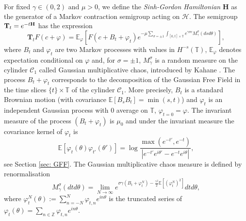 \documentclass[11pt]{amsart}
\numberwithin{equation}{section}
\theoremstyle{definition}
\newcommand{\Z}{\mathbb{Z}}
\def\E{\mathbb{E}}
\newcommand{\mc}{\mathcal}
\def\T{\mathbb{T}}
\begin{document}
For fixed $\gamma\in (0,2)$ and $\mu>0$, we define the \emph{Sinh-Gordon Hamiltonian}  $\mathbf{H}$ as the generator of a Markov contraction 
semigroup acting on $\mc{H}$. The semigroup ${\bf T}_t=e^{-t{\mathbf H}}$ has the expression  
\begin{equation}
{\mathbf  T}_t F(c+\varphi)
=
\mathbb E_{\varphi}[F(c+B_t+\varphi_t)  e^{-\mu \sum_{\sigma = \pm 1}\int_{[0,t]\times \mathbb T} e^{\gamma \sigma c} M^\sigma_\gamma(dsd\theta)}],
\end{equation}
where $B_t$ and $\varphi_t$ are two Markov processes with values in $H^{-s}(\T)$, $\mathbb E_\varphi$ denotes expectation conditional on $\varphi$ and, for $\sigma=\pm 1$,  $M_\gamma^\sigma$ is a random measure on the cylinder $\mc{C}_1$ called Gaussian multiplicative chaos, introduced by Kahane \cite{Kahane85}.
The process $B_t+\varphi_t$ corresponds to the decomposition of the Gaussian Free Field in the 
time slices $\{t\}\times \T$ of the cylinder $\mc{C}_1$. More precisely, $B_t$
is a standard Brownian motion (with covariance $\mathbb E[B_sB_t]=\min(s,t)$) and $\varphi_t$ is an independent Gaussian process with $0$ average on $\T$, $\varphi_{t=0}=\varphi$. %
The invariant measure of the process $(B_t+\varphi_t)$ is $\mu_0$ and under the invariant measure the covariance kernel of $\varphi_t$ is  
\[\mathbb E[ \varphi_t(\theta) \varphi_{t'}(\theta')]= \log \frac{\max(e^{-t'}, e^{-t})}{|e^{-t'} e^{i \theta'}- e^{-t} e^{i \theta}|},\]
see Section \ref{sec: GFF}. The Gaussian multiplicative chaos measure is defined by renormalisation 
\[ M_\gamma^{\sigma}(dtd\theta)=\lim_{N\to \infty} 
e^{\sigma \gamma (B_t + \varphi_t^{N})-\frac{\gamma^2}{2}\mathbb E[ (\varphi_t^{N})^2]} dtd\theta, \]
where $\varphi_t^N(\theta):=\sum_{n=-N}^N\varphi_{t,n}e^{in\theta}$ is the truncated series of 
$\varphi_t(\theta)=\sum_{n\in \Z}\varphi_{t,n}e^{in\theta}$.
\end{document}
